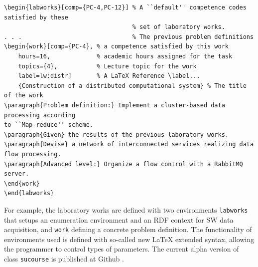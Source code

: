 \documentclass[
]{aiitart}
\begin{document}
\begin{verbatim}
\begin{labworks}[comp={PC-4,PC-12}] % A ``default'' competence codes satisfied by these
                                    % set of laboratory works.
. . .                               % The previous problem definitions
\begin{work}[comp={PC-4}, % a competence satisfied by this work
    hours=16,             % academic hours assigned for the task
    topics={4},           % Lecture topic for the work
    label=lw:distr]       % A LaTeX Reference \label...
    {Construction of a distributed computational system} % The title of the work
\paragraph{Problem definition:} Implement a cluster-based data processing according
to ``Map-reduce'' scheme.
\paragraph{Given} the results of the previous laboratory works.
\paragraph{Devise} a network of interconnected services realizing data flow processing.
\paragraph{Advanced level:} Organize a flow control with a RabbitMQ server.
\end{work}
\end{labworks}
\end{verbatim}

For example, the laboratory works are defined with two environments \verb|labworks| that setups an enumeration environment and an RDF context for SW data acquisition, and \verb|work| defining a concrete problem definition.  %
The functionality of environments used is defined with so-called new \LaTeX{} extended syntax, allowing the programmer to control types of parameters.  %
The current alpha version of class \verb|sucourse| is published at Github \cite{ghs}. %
\end{document}
